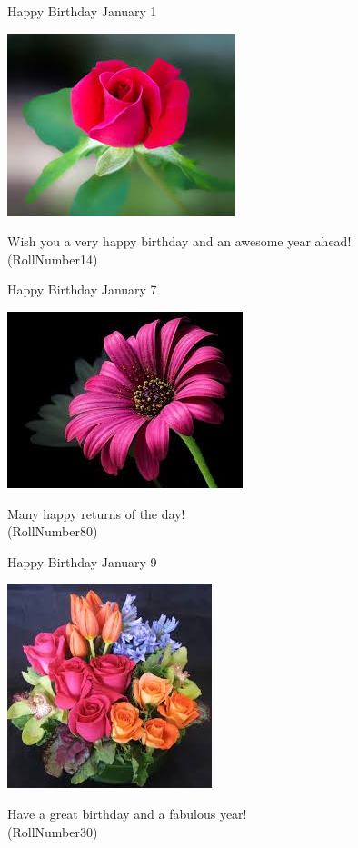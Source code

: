 \documentclass[table, landscape]{beamer}
\begin{document}
\begin{frame}{\color{blue}Happy Birthday }
{January 1}
\begin{center}
\includegraphics[height=0.5\textheight]{flowers/f3.jpeg}

Wish you a very happy birthday and an awesome year ahead! \\ \vspace{0.5cm}{\Large name9} (RollNumber14)
\end{center}
\end{frame}
\begin{frame}{\color{red}Happy Birthday }
{January 7}
\begin{center}
\includegraphics[height=0.5\textheight]{flowers/f2.jpeg}

Many happy returns of the day! \\ \vspace{0.5cm}{\Large name73} (RollNumber80)
\end{center}
\end{frame}
\begin{frame}{\color{red}Happy Birthday }
{January 9}
\begin{center}
\includegraphics[height=0.5\textheight]{flowers/f9.jpeg}

Have a great birthday and a fabulous year! \\ \vspace{0.5cm}{\Large name25} (RollNumber30)
\end{center}
\end{frame}
\end{document}
